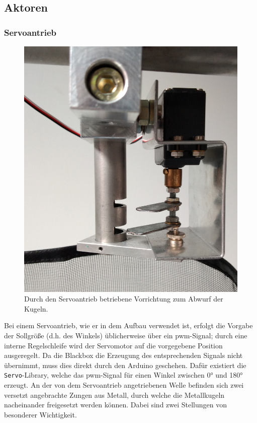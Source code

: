 \documentclass{kis}
\begin{document}
\clearpage
\subsection{Aktoren}
\subsubsection{Servoantrieb}
\begin{figure}
	\raggedleft
	\vspace*{-0.5\baselineskip}
	\includegraphics[width=0.9\linewidth]{IMG_20200525_171143701.jpg}
	\caption[Vorrichtung zum Abwurf der Kugeln]{Durch den Servoantrieb betriebene Vorrichtung zum Abwurf der Kugeln.}
\end{figure}
Bei einem Servoantrieb, wie er in dem Aufbau verwendet ist, erfolgt die Vorgabe der Sollgröße (d.h. des Winkels) üblicherweise über ein \gls{pwm}-Signal; durch eine interne Regelschleife wird der Servomotor auf die vorgegebene Position ausgeregelt. Da die Blackbox die Erzeugung des entsprechenden Signals nicht übernimmt, muss dies direkt durch den Arduino geschehen. Dafür existiert die \texttt{Servo}-Library, welche das \gls{pwm}-Signal für einen Winkel zwischen 0° und 180° erzeugt.
An der von dem Servoantrieb angetriebenen Welle befinden sich zwei versetzt angebrachte Zungen aus Metall, durch welche die Metallkugeln nacheinander freigesetzt werden können. Dabei sind zwei Stellungen von besonderer Wichtigkeit.
\end{document}
